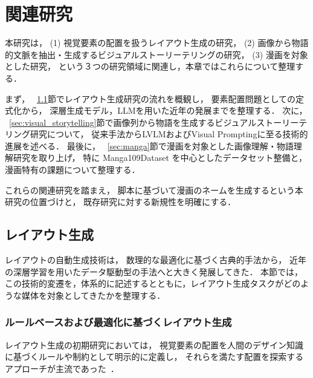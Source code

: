 \documentclass[a4j,12pt,dvipdfmx]{jsreport}
\begin{document}
\ifdefined\ismain\else
   \pagestyle{fancy}
   \lhead{\rightmark}
   \renewcommand{\chaptermark}[1]{\markboth{第\ \thechapter\ 章\ #1}{}}
   \setlength{\headheight}{16.5pt}
   \titleformat{\chapter}[hang]{\LARGE\bfseries}{\prechaptername\thechapter\postchaptername}{1em}{}
\fi

\chapter{関連研究}\label{chap:relatedworks}

本研究は，
(1) 視覚要素の配置を扱うレイアウト生成の研究，
(2) 画像から物語的文脈を抽出・生成するビジュアルストーリーテリングの研究，
(3) 漫画を対象とした研究，
という３つの研究領域に関連し，本章ではこれらについて整理する．

まず，
~\ref{sec:layout_generation}節でレイアウト生成研究の流れを概観し，
要素配置問題としての定式化から，
深層生成モデル，LLMを用いた近年の発展までを整理する．
次に，
~\ref{sec:visual_storytelling}節で画像列から物語を生成するビジュアルストーリーテリング研究について，
従来手法からLVLMおよびVisual Promptingに至る技術的進展を述べる．
最後に，
~\ref{sec:manga}節で漫画を対象とした画像理解・物語理解研究を取り上げ，
特に Manga109Dataset を中心としたデータセット整備と，
漫画特有の課題について整理する．

これらの関連研究を踏まえ，
脚本に基づいて漫画のネームを生成するという本研究の位置づけと，
既存研究に対する新規性を明確にする．

\section{レイアウト生成}\label{sec:layout_generation}
レイアウトの自動生成技術は，
数理的な最適化に基づく古典的手法から，
近年の深層学習を用いたデータ駆動型の手法へと大きく発展してきた．
本節では，この技術的変遷を，体系的に記述するとともに，レイアウト生成タスクがどのような媒体を対象としてきたかを整理する．

\subsection{ルールベースおよび最適化に基づくレイアウト生成}

レイアウト生成の初期研究においては，
視覚要素の配置を人間のデザイン知識に基づくルールや制約として明示的に定義し，
それらを満たす配置を探索するアプローチが主流であった~\cite{lok1999survey,chuah1995sagebook,kamps1999constraints}．%
\end{document}

